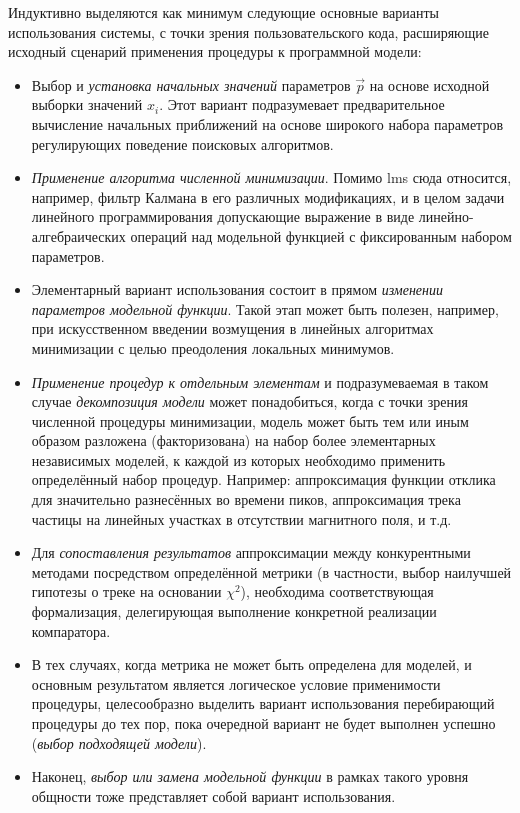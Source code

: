 Индуктивно выделяются как минимум следующие основные варианты
использования системы, с точки зрения пользовательского кода,
расширяющие исходный сценарий применения процедуры к
программной модели:
\begin{itemize}
    \item Выбор и \emph{установка начальных значений} параметров $\vec{p}$
    на основе исходной выборки значений $x_i$. Этот вариант
    подразумевает предварительное вычисление начальных приближений
    на основе широкого набора параметров регулирующих поведение
    поисковых алгоритмов.
    \item \emph{Применение алгоритма численной минимизации}. Помимо
    \acrshort{lms} сюда относится, например, фильтр Калмана в его
    различных модификациях,
    и в целом задачи линейного программирования допускающие выражение
    в виде линейно-алгебраических операций над модельной функцией с
    фиксированным набором параметров.
    \item Элементарный вариант использования состоит в прямом
    \emph{изменении параметров модельной функции}. Такой этап может быть
    полезен, например, при искусственном введении возмущения в
    линейных алгоритмах минимизации с целью преодоления локальных
    минимумов.
    \item \emph{Применение процедур к отдельным элементам} и подразумеваемая
    в таком случае \emph{декомпозиция модели} может понадобиться,
    когда с точки зрения численной процедуры минимизации, модель может
    быть тем или иным образом разложена (факторизована) на набор более
    элементарных независимых моделей, к каждой из которых необходимо
    применить определённый набор процедур. Например: аппроксимация
    функции отклика для значительно разнесённых во времени пиков,
    аппроксимация трека частицы на линейных участках в отсутствии
    магнитного поля, и т.д.
    \item Для \emph{сопоставления результатов} аппроксимации между
    конкурентными методами посредством определённой метрики (в частности,
    выбор наилучшей гипотезы о треке на основании $\chi^2$), необходима
    соответствующая формализация, делегирующая выполнение
    конкретной реализации компаратора.
    \item В тех случаях, когда метрика не может быть определена для
    моделей, и основным результатом является логическое условие применимости
    процедуры, целесообразно выделить вариант использования перебирающий
    процедуры до тех пор, пока очередной вариант не будет
    выполнен успешно (\emph{выбор подходящей модели}).
    \item Наконец, \emph{выбор или замена модельной функции} в рамках
    такого уровня общности тоже представляет собой вариант использования.
\end{itemize}

